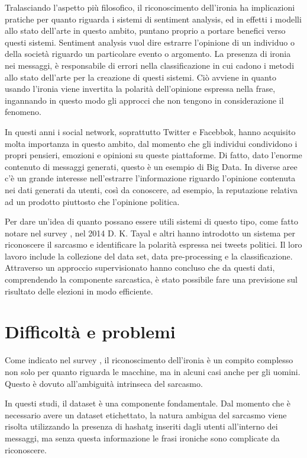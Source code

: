 \documentclass[oneside]{book}
\begin{document}
Tralasciando l'aspetto più filosofico, il riconoscimento dell'ironia ha implicazioni pratiche per quanto riguarda i sistemi di sentiment analysis, ed in effetti i modelli allo stato dell'arte in questo ambito, puntano proprio a portare benefici verso questi sistemi. Sentiment analysis vuol dire estrarre l'opinione di un individuo o della società riguardo un particolare evento o argomento. La presenza di ironia nei messaggi, è responsabile di errori nella classificazione in cui cadono i metodi allo stato dell'arte per la creazione di questi sistemi. Ciò avviene in quanto usando l'ironia viene invertita la polarità dell'opinione espressa nella frase, ingannando in questo modo gli approcci che non tengono in considerazione il fenomeno.

In questi anni i social network, soprattutto Twitter e Facebbok, hanno acquisito molta importanza in questo ambito, dal momento che gli individui condividono i propri pensieri, emozioni e opinioni su queste piattaforme. Di fatto, dato l'enorme contenuto di messaggi generati, questo è un esempio di Big Data. In diverse aree c'è un grande interesse nell'estrarre l'informazione riguardo l'opinione contenuta nei dati generati da utenti, così da conoscere, ad esempio, la reputazione relativa ad un prodotto piuttosto che l'opinione politica.

Per dare un'idea di quanto possano essere utili sistemi di questo tipo, come fatto notare nel survey \cite{survey1}, nel 2014 D. K. Tayal e altri \cite{political} hanno introdotto un sistema per riconoscere il sarcasmo e identificare la polarità espressa nei tweets politici. Il loro lavoro include la collezione del data set, data pre-processing e la classificazione. Attraverso un approccio supervisionato hanno concluso che da questi dati, comprendendo la componente sarcastica, è stato possibile fare una previsione sul risultato delle elezioni in modo efficiente.

\section{Difficoltà e problemi}
Come indicato nel survey \cite{survey3}, il riconoscimento dell'ironia è un compito complesso non solo per quanto riguarda le macchine, ma in alcuni casi anche per gli uomini. Questo è dovuto all'ambiguità intrinseca del sarcasmo.

In questi studi, il dataset è una componente fondamentale. Dal momento che è necessario avere un dataset etichettato, la natura ambigua del sarcasmo viene risolta utilizzando la presenza di hashatg inseriti dagli utenti all'interno dei messaggi, ma senza questa informazione le frasi ironiche sono complicate da riconoscere.
\end{document}
